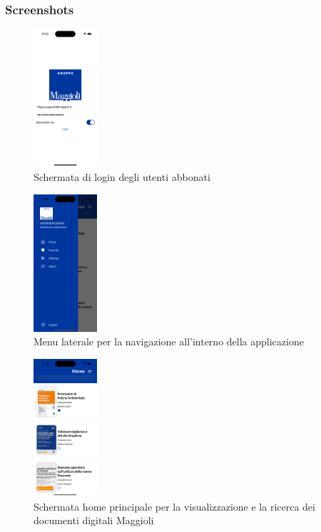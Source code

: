 \subsubsection{Screenshots}
\begin{multicols}{3}
            \begin{figure}[H]
                \includegraphics[width=0.21\textwidth]{img/Simulator Screen Shot - iPhone 14 Pro - 2022-10-05 at 11.22.08.png}
                \caption{Schermata di login degli utenti abbonati}
                \label{loginios}
            \end{figure}

            \begin{figure}[H]
                \includegraphics[width=0.21\textwidth]{img/Simulator Screen Shot - iPhone 14 Pro - 2022-10-05 at 10.40.04.png}
                \caption{Menu laterale per la navigazione all'interno della applicazione}
                \label{sidenavios}
            \end{figure}
            
            \begin{figure}[H]
                \includegraphics[width=0.21\textwidth]{img/Simulator Screen Shot - iPhone 14 Pro - 2022-10-05 at 10.39.58.png}
                \caption{Schermata home principale per la visualizzazione e la ricerca dei documenti digitali Maggioli}
                \label{homeios}
            \end{figure}
            

\end{multicols}
